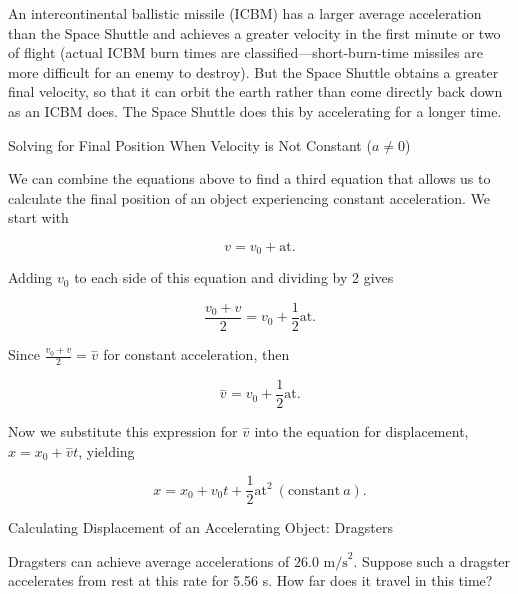 \documentclass[
]{book}
\begin{document}
An intercontinental ballistic missile (ICBM) has a larger average
acceleration than the Space Shuttle and achieves a greater velocity in
the first minute or two of flight (actual ICBM burn times are
classified---short-burn-time missiles are more difficult for an enemy to
destroy). But the Space Shuttle obtains a greater final velocity, so
that it can orbit the earth rather than come directly back down as an
ICBM does. The Space Shuttle does this by accelerating for a longer
time.

\hypertarget{fs-id1164906444525}{}
Solving for Final Position When Velocity is Not Constant (\(a \neq 0\))

We can combine the equations above to find a third equation that allows
us to calculate the final position of an object experiencing constant
acceleration. We start with

\leavevmode{}%
\[{v = {v_{0} + \text{at}}.}{}\]

Adding \(v_{0}{}\) to each side of this equation and dividing by 2 gives

\leavevmode{}%
\[{{\frac{v_{0} + v}{2} = {v_{0} + \frac{1}{2}}}\text{at}\text{.}}{}\]

Since \({\frac{v_{0} + v}{2} = \overset{-}{v}}{}\) for constant
acceleration, then

\leavevmode{}%
\[{{\overset{-}{v} = {v_{0} + \frac{1}{2}}}\text{at}\text{.}}{}\]

Now we substitute this expression for \(\overset{-}{v}{}\) into the
equation for displacement, \({{x = {x_{0} + \overset{-}{v}}}t}{}\),
yielding

\leavevmode{}%
\[{{x = {x_{0} + v_{0}}}{t + \frac{1}{2}}\text{at}^{2}\ (\text{constant}\ a)\text{.}}{}\]

\hypertarget{fs-id1164906457202}{}
Calculating Displacement of an Accelerating Object: Dragsters

Dragsters can achieve average accelerations of
\({\text{26}\text{.}\text{0\ m/s}^{2}}{}\). Suppose such a dragster
accelerates from rest at this rate for 5.56 s. How far does it travel in
this time?
\end{document}
